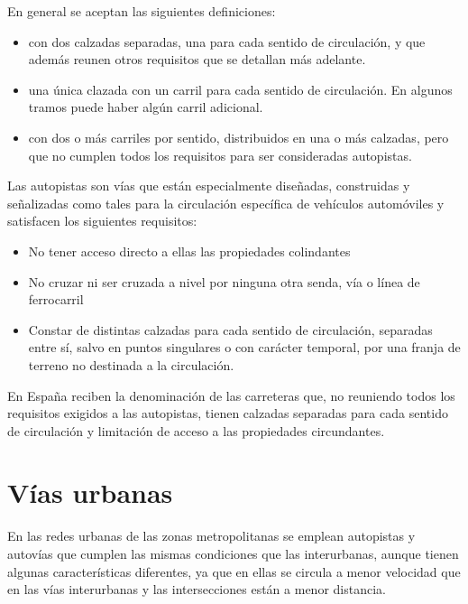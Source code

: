 \documentclass[letterpaper,10pt,english]{sphinxmanual}
\let\sphinxpxdimen\pdfpxdimen\else\newdimen\sphinxpxdimen
\begin{document}
En general se aceptan las siguientes definiciones:
\begin{itemize}
\item {} 
 con dos calzadas separadas, una para cada sentido de circulación, y que además reunen otros requisitos que se detallan más adelante.

\item {} 
 una única clazada con un carril para cada sentido de circulación. En algunos tramos puede haber algún carril adicional.

\item {} 
 con dos o más carriles por sentido, distribuidos en una o más calzadas, pero que no cumplen todos los requisitos para ser consideradas autopistas.

\end{itemize}

Las autopistas son vías que están especialmente diseñadas, construidas y señalizadas como tales para la circulación específica de vehículos automóviles y satisfacen los siguientes requisitos:
\begin{itemize}
\item {} 
No tener acceso directo a ellas las propiedades colindantes

\item {} 
No cruzar ni ser cruzada a nivel por ninguna otra senda, vía o línea de ferrocarril

\item {} 
Constar de distintas calzadas para cada sentido de circulación, separadas entre sí, salvo en puntos singulares o con carácter temporal, por una franja de terreno no destinada a la circulación.

\end{itemize}

En España reciben la denominación de  las carreteras que, no reuniendo todos los requisitos exigidos a las autopistas, tienen calzadas separadas para cada sentido de circulación y limitación de acceso a las propiedades circundantes.

\noindent\sphinxincludegraphics[width=900\sphinxpxdimen]{{definicion_autopistas}.png}


\section{Vías urbanas}
\label{\detokenize{trazado:vias-urbanas}}
En las redes urbanas de las zonas metropolitanas se emplean autopistas y autovías que cumplen las mismas condiciones que las interurbanas, aunque tienen algunas características diferentes, ya que en ellas se circula a menor velocidad que en las vías interurbanas y las intersecciones están a menor distancia.
\end{document}

